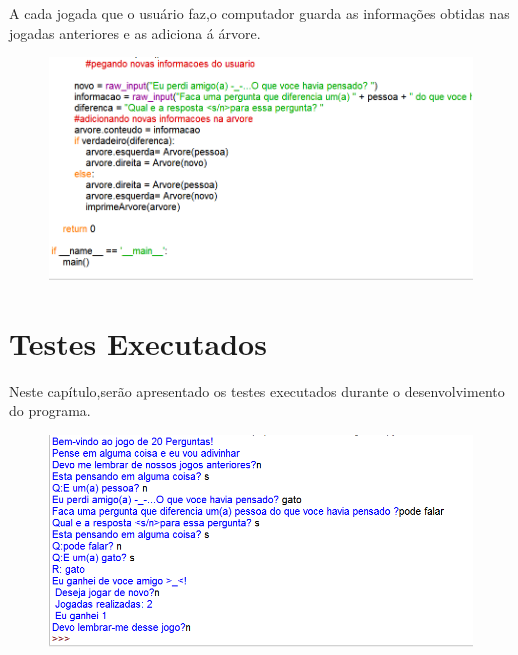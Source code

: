 \documentclass[12pt]{article}
\begin{document}
	\newpage
	\par A cada jogada que o usuário faz,o computador guarda as informações obtidas nas jogadas anteriores e as adiciona á árvore.
	\begin{figure}[ht]
		\centering
		\includegraphics[width=.5\textwidth]{figura4.png}
		\caption{}
		
	\end{figure}
	\newpage
\section{Testes Executados}
Neste capítulo,serão apresentado os testes executados durante o desenvolvimento do programa.
	\begin{figure}[ht]
		\centering
		\includegraphics[width=.5\textwidth]{fig0.png}
		\caption{
		}
	\end{figure}
	
\end{document}
